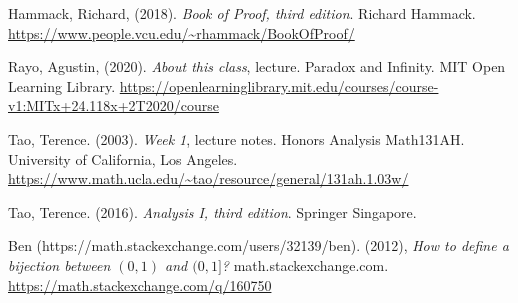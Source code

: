 \documentclass{article}[12pt]
\begin{document}
    \begin{thebibliography}{9}
        
        Hammack, Richard, (2018). \emph{Book of Proof, third edition}. Richard Hammack. \url{https://www.people.vcu.edu/~rhammack/BookOfProof/}
        
        Rayo, Agustin, (2020). \emph{About this class}, lecture. Paradox and Infinity. MIT Open Learning Library. \url{https://openlearninglibrary.mit.edu/courses/course-v1:MITx+24.118x+2T2020/course}
        
        Tao, Terence. (2003). \emph{Week 1}, lecture notes. Honors Analysis Math131AH. University of California, Los Angeles. \url{https://www.math.ucla.edu/~tao/resource/general/131ah.1.03w/}
        
        Tao, Terence. (2016). \emph{Analysis I, third edition}. Springer Singapore.
        
        \bibitem{}
        Ben (https://math.stackexchange.com/users/32139/ben). (2012), \emph{How to define a bijection between $(0,1)$ and $(0,1]$?} math.stackexchange.com. \url{https://math.stackexchange.com/q/160750}

        
        
    \end{thebibliography}
    
    
\end{document}
